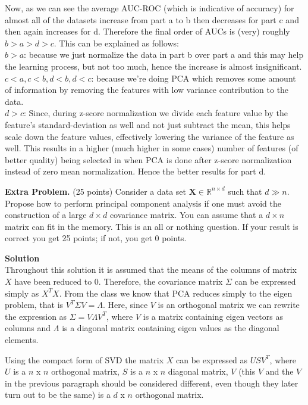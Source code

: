 \documentclass[twoside]{article}
\begin{document}
	
Now, as we can see the average AUC-ROC (which is indicative of accuracy) for almost all of the datasets increase from part a to b then decreases for part c and then again increases for d. Therefore the final order of AUCs is (very) roughly $b > a > d > c$. This can be explained as follows:\\
$b>a$: because we just normalize the data in part b over part a and this may help the learning process, but not too much, hence the increase is almost insignificant. \\
$c < a, c < b, d < b, d < c$: because we're doing PCA which removes some amount of information by removing the features with low variance contribution to the data.\\
$d > c$: Since, during z-score normalization we divide each feature value by the feature's standard-deviation as well and not just subtract the mean, this helps scale down the feature values, effectively lowering the variance of the feature as well. This results in a higher (much higher in some cases) number of features (of better quality) being selected in when PCA is done after z-score normalization instead of zero mean normalization. Hence the better results for part d.


\newpage

\textbf{Extra Problem.} (25 points) Consider a data set $\mathbf{X}\in\mathbb{R}^{n\times d}$ such that $d\gg n$. Propose how to perform principal component analysis if one must avoid the construction of a large $d\times d$ covariance matrix. You can assume that a $d \times n$ matrix can fit in the memory. This is an all or nothing question. If your result is correct you get 25 points; if not, you get 0 points.


\textbf{Solution}\\

Throughout this solution it is assumed that the means of the columns of matrix $X$ have been reduced to 0. Therefore, the covariance matrix $\Sigma$ can be expressed simply as $X^T X$. From the class we know that PCA reduces simply to the eigen problem, that is $V^T \Sigma V = \Lambda$. Here, since $V$ is an orthogonal matrix we can rewrite the expression as $\Sigma = V \Lambda V^T$, where $V$ is a matrix containing eigen vectors as columns and $\Lambda$ is a diagonal matrix containing eigen values as the diagonal elements.

Using the compact form of SVD the matrix $X$ can be expressed as $USV^T$, where $U$ is a $n$ x $n$ orthogonal matrix, $S$ is a $n$ x $n$ diagonal matrix, $V$ (this $V$ and the $V$ in the previous paragraph should be considered different, even though they later turn out to be the same) is a $d$ x $n$ orthogonal matrix.
\end{document}
